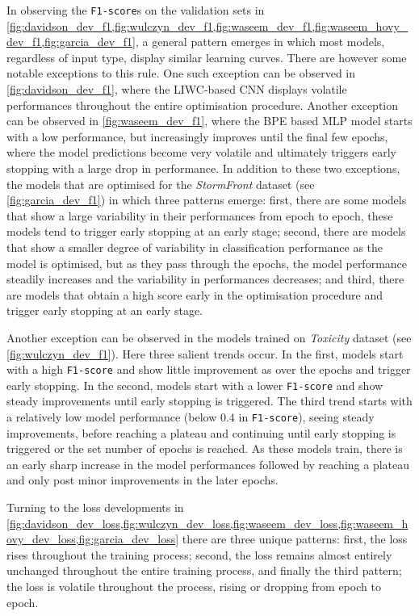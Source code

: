 In observing the \texttt{F1-score}s on the validation sets in \cref{fig:davidson_dev_f1,fig:wulczyn_dev_f1,fig:waseem_dev_f1,fig:waseem_hovy_dev_f1,fig:garcia_dev_f1}, a general pattern emerges in which most models, regardless of input type, display similar learning curves.
There are however some notable exceptions to this rule. 
One such exception can be observed in \cref{fig:davidson_dev_f1}, where the LIWC-based CNN displays volatile performances throughout the entire optimisation procedure.
Another exception can be observed in \cref{fig:waseem_dev_f1}, where the BPE based MLP model starts with a low performance, but increasingly improves until the final few epochs, where the model predictions become very volatile and ultimately triggers early stopping with a large drop in performance.
In addition to these two exceptions, the models that are optimised for the \textit{StormFront} dataset (see \cref{fig:garcia_dev_f1})  in which three patterns emerge: first, there are some models that show a large variability in their performances from epoch to epoch, these models tend to trigger early stopping at an early stage; second, there are models that show a smaller degree of variability in classification performance as the model is optimised, but as they pass through the epochs, the model performance steadily increases and the variability in performances decreases; and third, there are models that obtain a high score early in the optimisation procedure and trigger early stopping at an early stage.

Another exception can be observed in the models trained on \textit{Toxicity} dataset (see \cref{fig:wulczyn_dev_f1}). Here three salient trends occur.
In the first, models start with a high \texttt{F1-score} and show little improvement as over the epochs and trigger early stopping.
In the second, models start with a lower \texttt{F1-score} and show steady improvements until early stopping is triggered.
The third trend starts with a relatively low model performance (below $0.4$ in \texttt{F1-score}), seeing steady improvements, before reaching a plateau and continuing until early stopping is triggered or the set number of epochs is reached.
As these models train, there is an early sharp increase in the model performances followed by reaching a plateau and only post minor improvements in the later epochs.

Turning to the loss developments in \cref{fig:davidson_dev_loss,fig:wulczyn_dev_loss,fig:waseem_dev_loss,fig:waseem_hovy_dev_loss,fig:garcia_dev_loss} there are three unique patterns: first, the loss rises throughout the training process; second, the loss remains almost entirely unchanged throughout the entire training process, and finally the third pattern; the loss is volatile throughout the process, rising or dropping from epoch to epoch.


